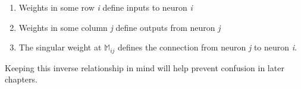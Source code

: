 \begin{enumerate}
	\item Weights in some row \textit{i} define inputs to neuron \textit{i}
	\item Weights in some column \textit{j} define outputs from neuron 
		\textit{j}
	\item The singular weight at $\mathbb{M}_{ij}$ defines the connection from 
		neuron \textit{j} to neuron \textit{i}.  
\end{enumerate}

Keeping this inverse relationship in mind will help prevent confusion in later 
chapters.
